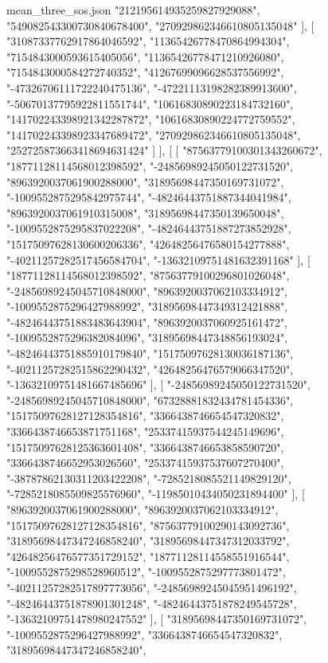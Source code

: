 \begin{filecontents*}[overwrite]{mean_three_sos.json}
    "212195614935259827929088",
    "549082543300730840678400",
    "270929862346610805135048"
   ],
   [
    "31087337762917864046592",
    "11365426778470864994304",
    "7154843000593615405056",
    "11365426778471210926080",
    "7154843000584272740352",
    "41267699096628537556992",
    "-47326706111722240475136",
    "-47221113198282389913600",
    "-50670137795922811551744",
    "10616830890223184732160",
    "141702243398921342287872",
    "10616830890224772759552",
    "141702243398923347689472",
    "270929862346610805135048",
    "252725873663418694631424"
   ]
  ],
  [
   [
    "87563779100301343260672",
    "18771128114568012398592",
    "-24856989245050122731520",
    "8963920037061900288000",
    "31895698447350169731072",
    "-1009552875295842975744",
    "-48246443751887344041984",
    "8963920037061910315008",
    "31895698447350139650048",
    "-1009552875295837022208",
    "-48246443751887273852928",
    "15175097628130600206336",
    "42648256476580154277888",
    "-40211257282517456584704",
    "-13632109751481632391168"
   ],
   [
    "18771128114568012398592",
    "87563779100296801026048",
    "-24856989245045710848000",
    "8963920037062103334912",
    "-1009552875296427988992",
    "31895698447349312421888",
    "-48246443751883483643904",
    "8963920037060925161472",
    "-1009552875296382084096",
    "31895698447348856193024",
    "-48246443751885910179840",
    "15175097628130036187136",
    "-40211257282515862290432",
    "42648256476579066347520",
    "-13632109751481667485696"
   ],
   [
    "-24856989245050122731520",
    "-24856989245045710848000",
    "67328881832434781454336",
    "15175097628127128354816",
    "3366438746654547320832",
    "3366438746653871751168",
    "25337415937544245149696",
    "15175097628125363601408",
    "3366438746653858590720",
    "3366438746652953026560",
    "25337415937537607270400",
    "-38787862130311203422208",
    "-7285218085521149829120",
    "-7285218085509825576960",
    "-11985010434050231894400"
   ],
   [
    "8963920037061900288000",
    "8963920037062103334912",
    "15175097628127128354816",
    "87563779100290143092736",
    "31895698447347246858240",
    "31895698447347312033792",
    "42648256476577351729152",
    "18771128114558551916544",
    "-1009552875298528960512",
    "-1009552875297773801472",
    "-40211257282517897773056",
    "-24856989245045951496192",
    "-48246443751878901301248",
    "-48246443751878249545728",
    "-13632109751478980247552"
   ],
   [
    "31895698447350169731072",
    "-1009552875296427988992",
    "3366438746654547320832",
    "31895698447347246858240",

\end{filecontents*}
